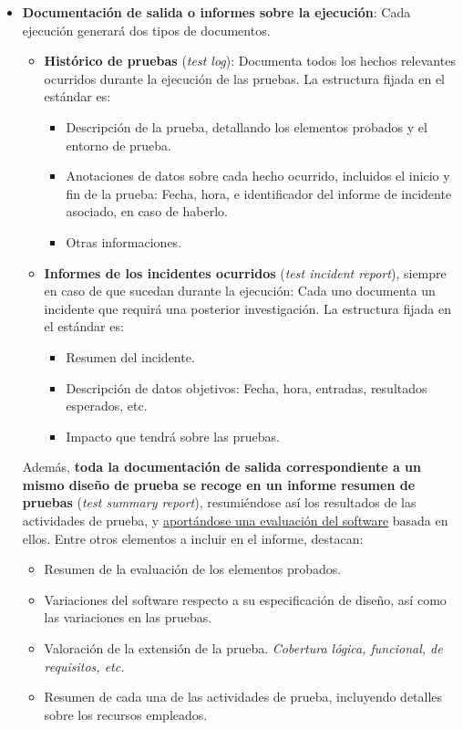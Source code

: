 \begin{itemize}
    \item \textbf{Documentación de salida o informes sobre la ejecución}: Cada ejecución generará dos tipos de documentos.
    \begin{itemize}
        \item \textbf{Histórico de pruebas} (\textit{test log}): Documenta todos los hechos relevantes ocurridos durante la ejecución de las pruebas. La estructura fijada en el estándar es:
        \begin{itemize}
            \item Descripción de la prueba, detallando los elementos probados y el entorno de prueba.
            \item Anotaciones de datos sobre cada hecho ocurrido, incluidos el inicio y fin de la prueba: Fecha, hora, e identificador del informe de incidente asociado, en caso de haberlo.
            \item Otras informaciones.
        \end{itemize}
        \item \textbf{Informes de los incidentes ocurridos} (\textit{test incident report}), siempre en caso de que sucedan durante la ejecución: Cada uno documenta un incidente que requirá una posterior investigación. La estructura fijada en el estándar es:
        \begin{itemize}
            \item Resumen del incidente.
            \item Descripción de datos objetivos: Fecha, hora, entradas, resultados esperados, etc.
            \item Impacto que tendrá sobre las pruebas.
        \end{itemize}
    \end{itemize}
    Además, \textbf{toda la documentación de salida correspondiente a un mismo diseño de prueba se recoge en un informe resumen de pruebas} (\textit{test summary report}), resumiéndose así los resultados de las actividades de prueba, y \uline{aportándose una evaluación del software} basada en ellos. Entre otros elementos a incluir en el informe, destacan:
    \begin{itemize}
        \item Resumen de la evaluación de los elementos probados.
        \item Variaciones del software respecto a su especificación de diseño, así como las variaciones en las pruebas.
        \item Valoración de la extensión de la prueba. \textit{Cobertura lógica, funcional, de requisitos, etc.}
        \item Resumen de cada una de las actividades de prueba, incluyendo detalles sobre los recursos empleados.
    \end{itemize} 
\end{itemize}

